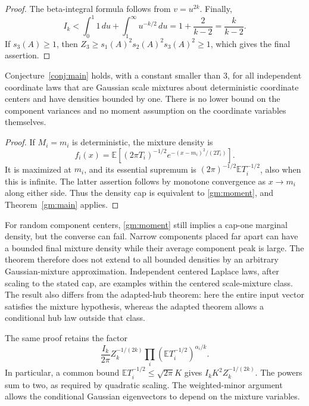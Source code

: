 \begin{proof}
The beta-integral formula follows from $v=u^{2k}$. Finally,
\[
 I_k<\int_0^1 1\,du+\int_1^\infty u^{-k/2}\,du
 =1+\frac2{k-2}=\frac{k}{k-2}.
\]
If $s_3(A)\ge1$, then $Z_3\ge s_1(A)^2s_2(A)^2s_3(A)^2\ge1$, which gives the final assertion.
\end{proof}

\begin{corollary}\label{gm:centered}
Conjecture~\ref{conj:main} holds, with a constant smaller than $3$, for all independent coordinate laws that are Gaussian scale mixtures about deterministic coordinate centers and have densities bounded by one. There is no lower bound on the component variances and no moment assumption on the coordinate variables themselves.
\end{corollary}
\begin{proof}
If $M_i=m_i$ is deterministic, the mixture density is
\[
 f_i(x)=\mathbb E\left[(2\pi T_i)^{-1/2}
 e^{-(x-m_i)^2/(2T_i)}\right].
\]
It is maximized at $m_i$, and its essential supremum is
$(2\pi)^{-1/2}\mathbb E T_i^{-1/2}$, also when this is infinite. The latter assertion follows by monotone convergence as $x\to m_i$ along either side. Thus the density cap is equivalent to \eqref{gm:moment}, and Theorem~\ref{gm:main} applies.
\end{proof}

\begin{remark}\label{gm:scope}
For random component centers, \eqref{gm:moment} still implies a cap-one marginal density, but the converse can fail. Narrow components placed far apart can have a bounded final mixture density while their average component peak is large. The theorem therefore does not extend to all bounded densities by an arbitrary Gaussian-mixture approximation. Independent centered Laplace laws, after scaling to the stated cap, are examples within the centered scale-mixture class. The result also differs from the adapted-hub theorem: here the entire input vector satisfies the mixture hypothesis, whereas the adapted theorem allows a conditional hub law outside that class.
\end{remark}

\begin{remark}
The same proof retains the factor
\[
 \frac{I_k}{2\pi}Z_k^{-1/(2k)}
 \prod_i(\mathbb E T_i^{-1/2})^{\alpha_i/k}.
\]
In particular, a common bound $\mathbb E T_i^{-1/2}\le\sqrt{2\pi}K$ gives $I_kK^2Z_k^{-1/(2k)}$. The powers sum to two, as required by quadratic scaling. The weighted-minor argument allows the conditional Gaussian eigenvectors to depend on the mixture variables.
\end{remark}

